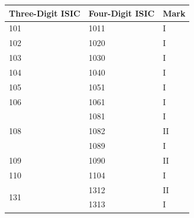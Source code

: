 \documentclass[12pt,a4paper]{article}
\begin{document}
{%
\begin{longtable}{@{}lll@{}}
		\toprule
		\multicolumn{1}{c}{\textbf{Three-Digit ISIC}} & \multicolumn{1}{c}{\textbf{Four-Digit ISIC}} & \multicolumn{1}{c}{\textbf{Mark}} \\ \midrule
		101                                           & 1011                                         & I                                 \\ \midrule
		102                                           & 1020                                         & I                                 \\ \midrule
		103                                           & 1030                                         & I                                 \\ \midrule
		104                                           & 1040                                         & I                                 \\ \midrule
		105                                           & 1051                                         & I                                 \\ \midrule
		106                                           & 1061                                         & I                                 \\ \midrule
		\multirow{3}{*}{108}                          & 1081                                         & I                                 \\ \cmidrule(l){2-3} 
		& 1082                                         & II                                \\ \cmidrule(l){2-3} 
		& 1089                                         & I                                 \\ \midrule
		109                                           & 1090                                         & II                                \\ \midrule
		110                                           & 1104                                         & I                                 \\ \midrule
		\multirow{2}{*}{131}                          & 1312                                         & II                                \\ \cmidrule(l){2-3} 
		& 1313                                         & I                                 \\ \midrule

\end{longtable}}
\end{document}
